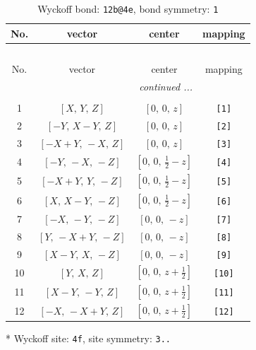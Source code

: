 \documentclass[fleqn,8pt]{jsarticle}
\begin{document}
\begin{longtable}{cccc}
\caption{Wyckoff bond: {\tt 12b@4e}, bond symmetry: {\tt 1}}
 \\
 \hline \hline
No. & vector & center & mapping \\ \hline \endfirsthead

\multicolumn{3}{l}{\tablename\ \thetable{}} \\
 \hline \hline
No. & vector & center & mapping \\ \hline \endhead

 \hline \hline
\multicolumn{3}{r}{\footnotesize\it continued ...} \\ \endfoot

 \hline \hline
\multicolumn{3}{r}{} \\ \endlastfoot

1 & $\left[ X,\, Y,\, Z \right]$ & $\left[ 0,\, 0,\, z \right]$ & {\tt [1]} \\ \hline
2 & $\left[ - Y,\, X - Y,\, Z \right]$ & $\left[ 0,\, 0,\, z \right]$ & {\tt [2]} \\ \hline
3 & $\left[ - X + Y,\, - X,\, Z \right]$ & $\left[ 0,\, 0,\, z \right]$ & {\tt [3]} \\ \hline
4 & $\left[ - Y,\, - X,\, - Z \right]$ & $\left[ 0,\, 0,\, \frac{1}{2} - z \right]$ & {\tt [4]} \\ \hline
5 & $\left[ - X + Y,\, Y,\, - Z \right]$ & $\left[ 0,\, 0,\, \frac{1}{2} - z \right]$ & {\tt [5]} \\ \hline
6 & $\left[ X,\, X - Y,\, - Z \right]$ & $\left[ 0,\, 0,\, \frac{1}{2} - z \right]$ & {\tt [6]} \\ \hline
7 & $\left[ - X,\, - Y,\, - Z \right]$ & $\left[ 0,\, 0,\, - z \right]$ & {\tt [7]} \\ \hline
8 & $\left[ Y,\, - X + Y,\, - Z \right]$ & $\left[ 0,\, 0,\, - z \right]$ & {\tt [8]} \\ \hline
9 & $\left[ X - Y,\, X,\, - Z \right]$ & $\left[ 0,\, 0,\, - z \right]$ & {\tt [9]} \\ \hline
10 & $\left[ Y,\, X,\, Z \right]$ & $\left[ 0,\, 0,\, z + \frac{1}{2} \right]$ & {\tt [10]} \\ \hline
11 & $\left[ X - Y,\, - Y,\, Z \right]$ & $\left[ 0,\, 0,\, z + \frac{1}{2} \right]$ & {\tt [11]} \\ \hline
12 & $\left[ - X,\, - X + Y,\, Z \right]$ & $\left[ 0,\, 0,\, z + \frac{1}{2} \right]$ & {\tt [12]} \\
\end{longtable}
* Wyckoff site: {\tt 4f}, site symmetry: {\tt 3..}
\end{document}

